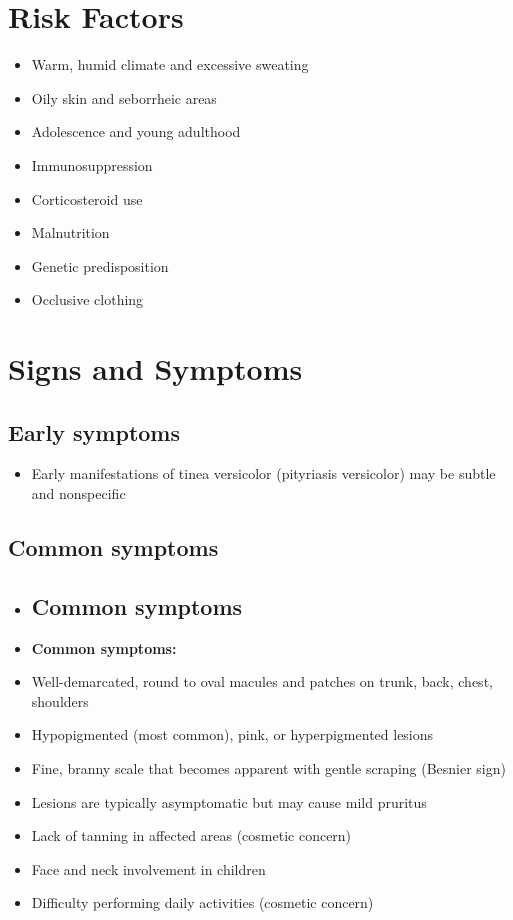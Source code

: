 \section{Risk Factors}

\begin{itemize}[noitemsep]
  \item Warm, humid climate and excessive sweating
  \item Oily skin and seborrheic areas
  \item Adolescence and young adulthood
  \item Immunosuppression
  \item Corticosteroid use
  \item Malnutrition
  \item Genetic predisposition
  \item Occlusive clothing
\end{itemize}

\section{Signs and Symptoms}

\subsection{Early symptoms}
\begin{itemize}[noitemsep]
  \item Early manifestations of tinea versicolor (pityriasis versicolor) may be subtle and nonspecific
\end{itemize}

\subsection{Common symptoms}
\begin{itemize}[noitemsep]
  \item \subsection{Common symptoms}
  \item \textbf{Common symptoms:}
  \item Well-demarcated, round to oval macules and patches on trunk, back, chest, shoulders
  \item Hypopigmented (most common), pink, or hyperpigmented lesions
  \item Fine, branny scale that becomes apparent with gentle scraping (Besnier sign)
  \item Lesions are typically asymptomatic but may cause mild pruritus
  \item Lack of tanning in affected areas (cosmetic concern)
  \item Face and neck involvement in children
  \item Difficulty performing daily activities (cosmetic concern)
\end{itemize}

